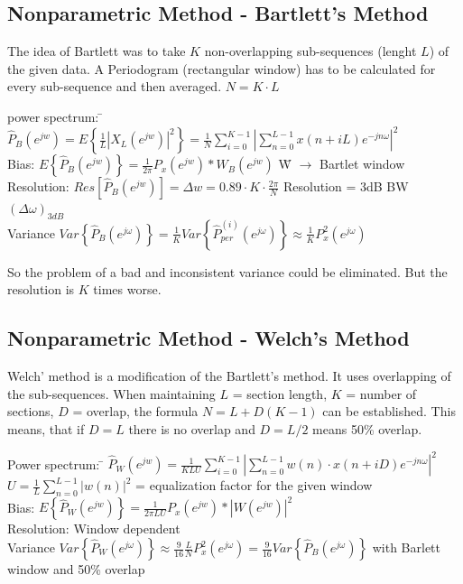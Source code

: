 \subsection{Nonparametric Method - Bartlett's Method }
The idea of Bartlett was to take $K$ non-overlapping sub-sequences (lenght $L$) of the given data.
A Periodogram (rectangular window) has to be calculated for every sub-sequence and then averaged. $N=K\cdot L$

\begin{tabbing}
power spectrum:  	\=  $\hat{P}_{B}(e^{jw}) = E\left\{\frac{1}{L}  \left|X_L(e^{jw})\right| ^2\right\} =  \frac{1}{N}\sum\limits_{i=0}^{K-1} \left|\sum\limits_{n=0}^{L-1} x(n+iL)e^{-jn\omega}\right| ^2$   \\
Bias: 				\>  $E\left\{ \hat{P}_{B}(e^{jw}) \right\} = \frac{1}{2 \pi}P_x(e^{jw})*W_B(e^{jw})$  \hspace{4cm} \= W $\to$ Bartlet window\\
Resolution: 		\>  $Res\left[\hat{P}_{B}(e^{jw})\right] = \Delta w = 0.89 \cdot K \cdot \frac{2 \pi}{N}$\> Resolution = 3dB BW $(\Delta\omega)_{3dB}$\\
Variance 			\> $Var\left\lbrace\hat{P}_{B}(e^{j\omega})\right\rbrace = \frac{1}{K} Var\left\lbrace \hat{P}_{per}^{(i)}(e^{j\omega}) \right\rbrace \approx \frac{1}{K}P^2_x(e^{j\omega})$\\
\end{tabbing}
So the problem of a bad and inconsistent variance could be eliminated. But the resolution is $K$ times worse.

\subsection{Nonparametric Method - Welch's Method }
Welch' method is a modification of the Bartlett's method. It uses overlapping of the sub-sequences.
When maintaining $L$ = section length, $K$ = number of sections, $D$ = overlap, the formula
$\boxed{N=L+D(K-1)}$ can be established. This means, that if $D=L$ there is no overlap and $D=L/2$ means 50\% overlap.

\begin{tabbing}
Power spectrum:  	\=  $\hat{P}_{W}(e^{jw}) =  \frac{1}{KLU}\sum\limits_{i=0}^{K-1} \left|\sum\limits_{n=0}^{L-1} w(n) \cdot x(n+iD)e^{-jn\omega}\right| ^2$   \\
\>						$U = \frac 1L \sum\limits_{n=0}^{L-1}|w(n)|^2$ = equalization factor for the given window\\
Bias: 				\>  $E\left\lbrace \hat{P}_{W}(e^{jw}) \right\rbrace = \frac{1}{2 \pi LU}P_x(e^{jw})*|W(e^{jw})|^2$\\
Resolution: 		\>  Window dependent\\
Variance 			\> $Var\left\lbrace\hat{P}_{W}(e^{j\omega})\right\rbrace \approx \frac{9}{16} \frac{L}{N}P^2_x(e^{j\omega}) =
\frac{9}{16} Var\left\lbrace\hat{P}_{B}(e^{j\omega})\right\rbrace$ \qquad with Barlett window and 50\% overlap\\
\end{tabbing}


